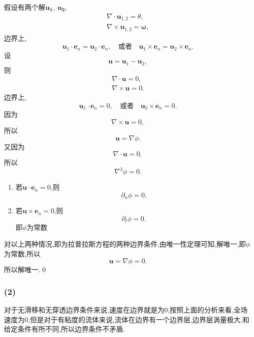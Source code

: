 \documentclass[12pt]{article}
\begin{document}
假设有两个解$\bm{u_1},\ \bm{u_2}$,
\begin{gather}
	\nabla \cdot \bm{u}_{1,2} = \theta,\\
	\nabla \times \bm{u}_{1,2} = \bm{\omega},
\end{gather}
边界上,
\begin{equation}
	\bm{u}_{1} \cdot \bm{e}_n = \bm{u}_{2} \cdot \bm{e}_n,\quad  \text{或者}\quad \bm{u}_{1} \times \bm{e}_n = \bm{u}_{2} \times \bm{e}_n.
\end{equation}
设
\begin{equation}
	\bm{u} = \bm{u}_{1} - \bm{u}_{2},
\end{equation}
则
\begin{gather}
	\nabla \cdot \bm{u} = 0,\\
	\nabla \times \bm{u} = 0.
\end{gather}
边界上,
\begin{equation}
	\bm{u}_{1} \cdot \bm{e}_n = 0,\quad  \text{或者}\quad \bm{u}_{2} \times \bm{e}_n = 0.
\end{equation}
因为
\begin{equation}
	\nabla \times \bm{u} = 0,
\end{equation}
所以
\begin{equation}
	\bm{u}=\nabla \phi.
\end{equation}
又因为
\begin{equation}
	\nabla \cdot \bm{u} = 0,
\end{equation}
所以
\begin{equation}
	\nabla^2 \phi = 0.
\end{equation}
\begin{enumerate}
	\item 若$\bm{u} \cdot \bm{e}_n = 0$,则
	\begin{equation}
		\partial_n \phi = 0.
	\end{equation}
	\item 若$\bm{u} \times \bm{e}_n = 0$,则
	\begin{equation}
		\partial_t \phi = 0.
	\end{equation}
	即$\phi$为常数
\end{enumerate}
对以上两种情况,即为拉普拉斯方程的两种边界条件,由唯一性定理可知,解唯一,即$\phi$为常数,所以
\begin{equation}
	\bm{u} = \nabla \phi = 0.
\end{equation}
所以解唯一.\qed

\subsubsection{(2)}

对于无滑移和无穿透边界条件来说,速度在边界就是为0,按照上面的分析来看,全场速度为0,但是对于有粘度的流体来说,流体在边界有一个边界层,边界层涡量极大,和给定条件有所不同,所以边界条件不矛盾.















\nocite{*}


\end{document}
